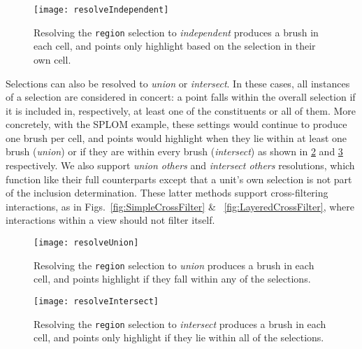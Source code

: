 \begin{figure}[h!]
  \centering
  \texttt{[image: resolveIndependent]}
  \caption{Resolving the \texttt{region} selection to \emph{independent}
produces a brush in each cell, and points only highlight based on the selection
in their own cell.}
  \label{fig:resolveIndependent}
\end{figure}

Selections can also be resolved to \emph{union} or \emph{intersect}. In these
cases, all instances of a selection are considered in concert: a point falls
within the overall selection if it is included in, respectively, at least one of
the constituents or all of them. More concretely, with the SPLOM example, these
settings would continue to produce one brush per cell, and points would
highlight when they lie within at least one brush (\emph{union}) or if they are
within every brush (\emph{intersect}) as shown in \cref{fig:resolveUnion} and
\cref{fig:resolveIntersect} respectively. We also support \emph{union others}
and \emph{intersect others} resolutions, which function like their full
counterparts except that a unit's own selection is not part of the inclusion
determination. These latter methods support cross-filtering interactions, as in
Figs.~\ref{fig:SimpleCrossFilter} \& ~\ref{fig:LayeredCrossFilter}, where
interactions within a view should not filter itself.

\begin{figure}[h!]
  \centering
  \texttt{[image: resolveUnion]}
  \caption{Resolving the \texttt{region} selection to \emph{union}
produces a brush in each cell, and points highlight if they fall within any of
the selections.}
  \label{fig:resolveUnion}
\end{figure}

\begin{figure}[h!]
  \centering
  \texttt{[image: resolveIntersect]}
  \caption{Resolving the \texttt{region} selection to \emph{intersect}
produces a brush in each cell, and points only highlight if they lie within all
of the selections.}
  \label{fig:resolveIntersect}
\end{figure}